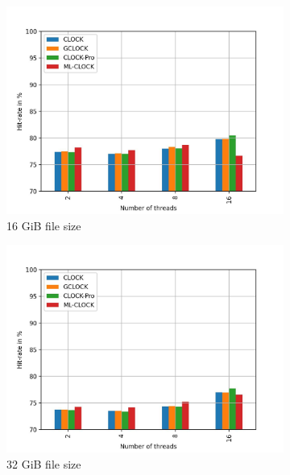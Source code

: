 \documentclass[
	12pt,
	a4paper,
	abstract,
	bibliography=totoc,
	chapterprefix,
	headings=openright,
	numbers=endperiod,
	parskip=half,
	twoside,
]{scrreprt}
\begin{document}
\begin{figure}[H]
	\centering
	\begin{subfigure}{0.4\textwidth}
		\includegraphics[width=\textwidth]{multi_16_gb_rw_50to50_uniform.jpg}		
		\caption{16 GiB file size}
		\label{fig:rw_50to50 16 uniform}
	\end{subfigure}
	\hfill
	\begin{subfigure}{0.4\textwidth}
		\includegraphics[width=\textwidth]{multi_32_gb_rw_50to50_uniform.jpg}		
		\caption{32 GiB file size}
		\label{fig:rw_50to50 32 uniform}
	\end{subfigure}
	\hfill
	\begin{subfigure}{0.4\textwidth}

\end{subfigure}
\end{figure}
\end{document}
